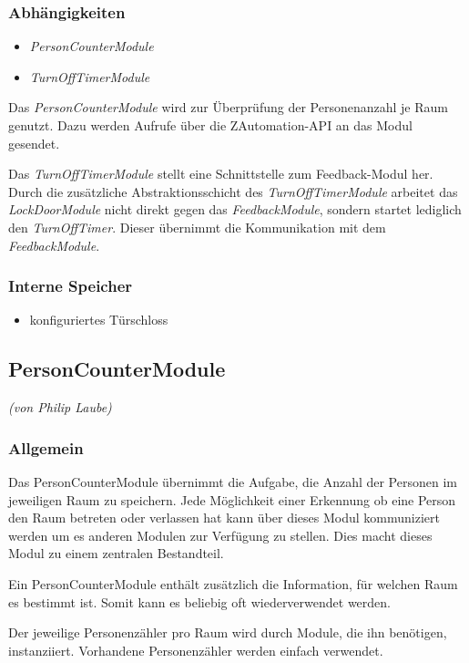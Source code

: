 \subsubsection{Abhängigkeiten}
\begin{itemize}
	\item \emph{PersonCounterModule}
	\item \emph{TurnOffTimerModule}
\end{itemize}
Das \emph{PersonCounterModule} wird zur Überprüfung der Personenanzahl je Raum genutzt. Dazu werden Aufrufe über die ZAutomation-API an das Modul gesendet.

Das \emph{TurnOffTimerModule} stellt eine Schnittstelle zum Feedback-Modul her. Durch die zusätzliche Abstraktionsschicht des \emph{TurnOffTimerModule} arbeitet das \emph{LockDoorModule} nicht direkt gegen das \emph{FeedbackModule}, sondern startet lediglich den \emph{TurnOffTimer}. Dieser übernimmt die Kommunikation mit dem \emph{FeedbackModule}.

\subsubsection{Interne Speicher}
\begin{itemize}
	\item konfiguriertes Türschloss
\end{itemize}


\subsection{PersonCounterModule}
\emph{(von Philip Laube)}
\subsubsection{Allgemein}
Das PersonCounterModule übernimmt die Aufgabe, die Anzahl der Personen im jeweiligen Raum zu speichern. Jede Möglichkeit einer Erkennung ob eine Person den Raum betreten oder verlassen hat kann über dieses Modul kommuniziert werden um es anderen Modulen zur Verfügung zu stellen. Dies macht dieses Modul zu einem zentralen Bestandteil.

Ein PersonCounterModule enthält zusätzlich die Information, für welchen Raum es bestimmt ist. Somit kann es beliebig oft wiederverwendet werden.

Der jeweilige Personenzähler pro Raum wird durch Module, die ihn benötigen, instanziiert. Vorhandene Personenzähler werden einfach verwendet.

